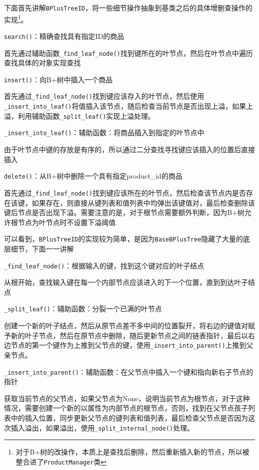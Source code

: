 \documentclass[cn,hazy,blue,10pt,normal]{elegantnote}
\begin{document}
下面首先讲解\texttt{BPlusTreeID}，将一些细节操作抽象到基类之后的具体增删查操作的实现\footnote{对于B+树的改操作，本质上是查找后删除，然后重新插入新的节点，所以被整合进了\texttt{ProductManager}类}。

\texttt{search()}：精确查找具有指定ID的商品

首先通过辅助函数\texttt{\_find\_leaf\_node()}找到键所在的叶节点，然后在叶节点中遍历查找具体的对象实现查找

\texttt{insert()}：向B+树中插入一个商品

首先通过\texttt{\_find\_leaf\_node()}找到键应该存入的叶节点，然后使用\texttt{\_insert\_into\_leaf()}将值插入该节点，随后检查当前节点是否出现上溢，如果上溢，利用辅助函数\texttt{\_split\_leaf()}实现上溢处理。

\texttt{\_insert\_into\_leaf()}：辅助函数：将商品插入到指定的叶节点中

由于叶节点中键的存放是有序的，所以通过二分查找寻找键应该插入的位置后直接插入

\texttt{delete()}：从B+树中删除一个具有指定product\_id的商品

首先通过\texttt{\_find\_leaf\_node()}找到键应该所在的叶节点，然后检查该节点内是否存在该键，如果存在，则直接从键列表和值列表中均弹出该键值对，最后检查删除该键后节点是否出现下溢。需要注意的是，对于根节点需要额外判断，因为B+树允许根节点为叶节点时不设置下溢阈值.

可以看到，\texttt{BPlusTreeID}的实现较为简单，是因为\texttt{BaseBPlusTree}隐藏了大量的底层细节，下面一一讲解

\texttt{\_find\_leaf\_node()}：根据输入的键，找到这个键对应的叶子结点

从根开始，查找输入键在每一个内部节点应该进入的下一个位置，直到到达叶子结点

\texttt{\_split\_leaf()}：辅助函数：分裂一个已满的叶节点

创建一个新的叶子结点，然后从原节点差不多中间的位置裂开，将右边的键值对赋予新的叶子节点，然后在原节点中删除，随后更新节点之间的链表指针，最后以右边节点的第一个键作为上推到父节点的键，使用\texttt{\_insert\_into\_parent()}上推到父亲节点。

\texttt{\_insert\_into\_parent()}：辅助函数：在父节点中插入一个键和指向新右子节点的指针

获取当前节点的父节点，如果父节点为None，说明当前节点为根节点，对于这种情况，需要创建一个新的以属性为内部节点的根节点，否则，找到在父节点孩子列表中的插入位置，同步更新父节点的键列表和值列表，最后检查父节点是否因为这次插入溢出，如果溢出，使用\texttt{\_split\_internal\_node()}处理。
\end{document}
